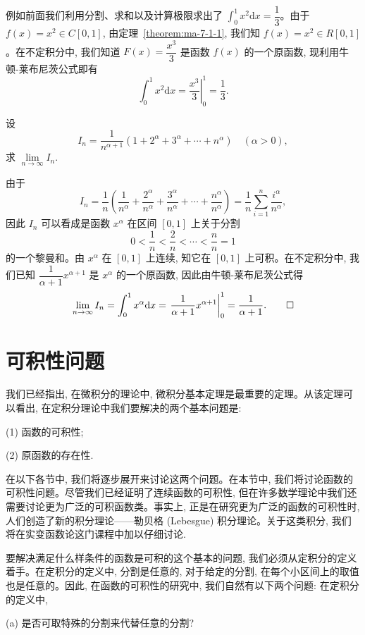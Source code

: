 例如前面我们利用分割、求和以及计算极限求出了 $\int_0^1x^2\mathrm dx=\dfrac13$。由于 $f(x)=x^2\in C[0,1]$, 由定理~\ref{theorem:ma-7-1-1}, 我们知 $f(x)=x^2\in R[0,1]$。在不定积分中, 我们知道 $F(x)=\dfrac{x^3}{3}$ 是函数 $f(x)$ 的一个原函数, 现利用牛顿-莱布尼茨公式即有
\[
  \int_0^1 x^2\mathrm dx=\left.\frac{x^3}{3}\right|_0^1=\frac13.
\]

\begin{example}\label{example:ma-7-1-1}
设
\[
  I_n=\frac1{n^{\alpha+1}}(1+2^\alpha+3^\alpha+\cdots+n^\alpha)\quad(\alpha>0),
\]
求 $\lim\limits_{n\to\infty}I_n$.
\end{example}


\begin{solve}
由于
\[
  I_n=\frac1n\left(\frac1{n^\alpha}+\frac{2^\alpha}{n^\alpha}+\frac{3^\alpha}{n^\alpha}+\cdots+\frac{n^\alpha}{n^\alpha}\right)
  =\frac1n\sum_{i=1}^n\frac{i^\alpha}{n^\alpha},
\]
因此 $I_n$ 可以看成是函数 $x^\alpha$ 在区间 $[0,1]$ 上关于分割
\[
  0<\frac1n<\frac2n<\cdots<\frac nn=1
\]
的一个黎曼和。由 $x^\alpha$ 在 $[0,1]$ 上连续, 知它在 $[0,1]$ 上可积。在不定积分中, 我们已知 $\dfrac1{\alpha+1}x^{\alpha+1}$ 是 $x^\alpha$ 的一个原函数, 因此由牛顿-莱布尼茨公式得
\[
  \lim_{n\to\infty}I_n=\int_0^1 x^\alpha\mathrm dx
  =\left.\frac1{\alpha+1}x^{\alpha+1}\right|_0^1
  =\frac1{\alpha+1}.
\qedhere
\]
\end{solve}


\section{可积性问题}
\label{sec:ma-7-2}

我们已经指出, 在微积分的理论中, 微积分基本定理是最重要的定理。从该定理可以看出, 在定积分理论中我们要解决的两个基本问题是:

(1) 函数的可积性;

(2) 原函数的存在性.

在以下各节中, 我们将逐步展开来讨论这两个问题。在本节中, 我们将讨论函数的可积性问题。尽管我们已经证明了连续函数的可积性, 但在许多数学理论中我们还需要讨论更为广泛的可积函数类。事实上, 正是在研究更为广泛的函数的可积性时, 人们创造了新的积分理论——勒贝格 (Lebesgue) 积分理论。关于这类积分, 我们将在实变函数论这门课程中加以仔细讨论.

要解决满足什么样条件的函数是可积的这个基本的问题, 我们必须从定积分的定义着手。在定积分的定义中, 分割是任意的, 对于给定的分割, 在每个小区间上的取值也是任意的。因此, 在函数的可积性的研究中, 我们自然有以下两个问题: 在定积分的定义中,

(a) 是否可取特殊的分割来代替任意的分割?

